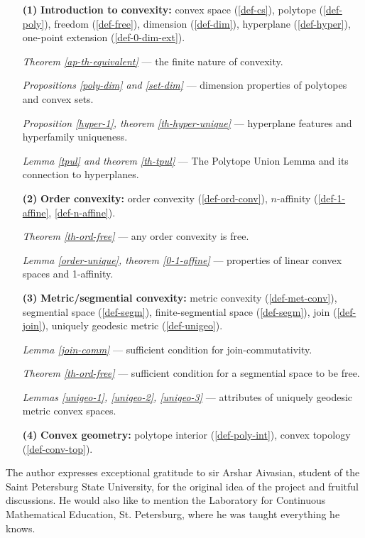 \documentclass[12pt, a4paper]{article}
\begin{document}
\begin{itemize}
    \item[\textbf{(1)}] \textbf{Introduction to convexity:} convex space (\ref{def-cs}), polytope (\ref{def-poly}), freedom (\ref{def-free}), dimension (\ref{def-dim}), hyperplane (\ref{def-hyper}), one-point extension (\ref{def-0-dim-ext}).

    \textit{Theorem \ref{ap-th-equivalent}} --- the finite nature of convexity.

    \textit{Propositions \ref{poly-dim} and \ref{set-dim}} --- dimension properties of polytopes and convex sets.

    \textit{Proposition \ref{hyper-1}, theorem \ref{th-hyper-unique}} --- hyperplane features and hyperfamily uniqueness.

    \textit{Lemma \ref{tpul} and theorem \ref{th-tpul}} --- The Polytope Union Lemma and its connection to hyperplanes.

    \item[\textbf{(2)}] \textbf{Order convexity:} order convexity (\ref{def-ord-conv}), \(n\)-affinity (\ref{def-1-affine}, \ref{def-n-affine}).
    
    \textit{Theorem \ref{th-ord-free}} --- any order convexity is free.

    \textit{Lemma \ref{order-unique}, theorem \ref{0-1-affine}} --- properties of linear convex spaces and 1-affinity.

    \item[\textbf{(3)}] \textbf{Metric/segmential convexity:} metric convexity (\ref{def-met-conv}), segmential space (\ref{def-segm}), finite-segmential space (\ref{def-segm}), join (\ref{def-join}), uniquely geodesic metric (\ref{def-unigeo}).
    
    \textit{Lemma \ref{join-comm}} --- sufficient condition for join-commutativity.

    \textit{Theorem \ref{th-ord-free}} --- sufficient condition for a segmential space to be free.

    \textit{Lemmas \ref{unigeo-1}, \ref{unigeo-2}, \ref{unigeo-3}} --- attributes of uniquely geodesic metric convex spaces.

    \item[\textbf{(4)}] \textbf{Convex geometry:} polytope interior (\ref{def-poly-int}), convex topology (\ref{def-conv-top}).
\end{itemize}

The author expresses exceptional gratitude to sir Arshar Aivasian, student of the Saint Petersburg State University, for the original idea of the project and fruitful discussions. He would also like to mention the Laboratory for Continuous Mathematical Education, St. Petersburg, where he was taught everything he knows.
\end{document}
